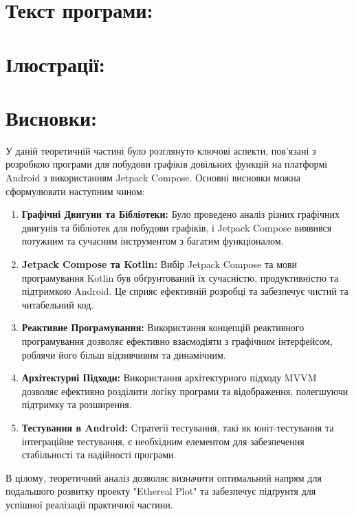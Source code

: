 \documentclass[14pt]{article}
\begin{document}
    \section{Текст програми:}
    


    \section{Ілюстрації:}
    


    \section{Висновки:}
У даній теоретичній частині було розглянуто ключові аспекти, пов'язані з розробкою програми для побудови графіків довільних функцій на платформі Android з використанням Jetpack Compose. Основні висновки можна сформулювати наступним чином:

\begin{enumerate}
    \item \textbf{Графічні Двигуни та Бібліотеки:} Було проведено аналіз різних графічних двигунів та бібліотек для побудови графіків, і Jetpack Compose виявився потужним та сучасним інструментом з багатим функціоналом.

    \item \textbf{Jetpack Compose та Kotlin:} Вибір Jetpack Compose та мови програмування Kotlin був обґрунтований їх сучасністю, продуктивністю та підтримкою Android. Це сприяє ефективній розробці та забезпечує чистий та читабельний код.

    \item \textbf{Реактивне Програмування:} Використання концепцій реактивного програмування дозволяє ефективно взаємодіяти з графічним інтерфейсом, роблячи його більш відзивчивим та динамічним.

    \item \textbf{Архітектурні Підходи:} Використання архітектурного підходу MVVM дозволяє ефективно розділити логіку програми та відображення, полегшуючи підтримку та розширення.

    \item \textbf{Тестування в Android:} Стратегії тестування, такі як юніт-тестування та інтеграційне тестування, є необхідним елементом для забезпечення стабільності та надійності програми.

\end{enumerate}

В цілому, теоретичний аналіз дозволяє визначити оптимальний напрям для подальшого розвитку проекту "Ethereal Plot" та забезпечує підґрунтя для успішної реалізації практичної частини. 
\end{document}
